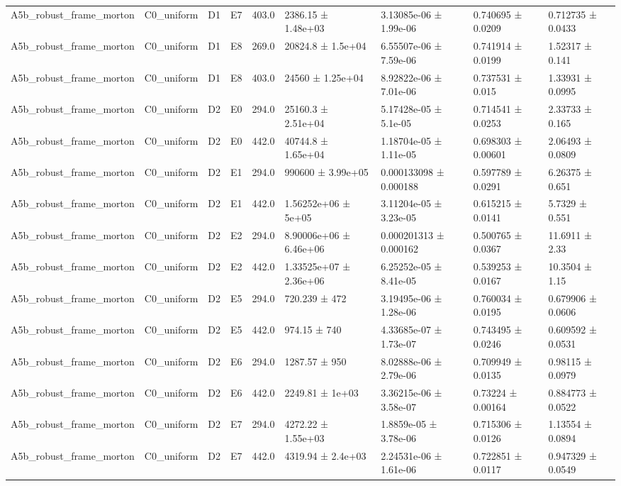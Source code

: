 \begin{table}
\begin{tabular}{lllllllll}
A5b\_robust\_frame\_morton & C0\_uniform & D1 & E7 & 403.0 & 2386.15 ± 1.48e+03 & 3.13085e-06 ± 1.99e-06 & 0.740695 ± 0.0209 & 0.712735 ± 0.0433 \\
A5b\_robust\_frame\_morton & C0\_uniform & D1 & E8 & 269.0 & 20824.8 ± 1.5e+04 & 6.55507e-06 ± 7.59e-06 & 0.741914 ± 0.0199 & 1.52317 ± 0.141 \\
A5b\_robust\_frame\_morton & C0\_uniform & D1 & E8 & 403.0 & 24560 ± 1.25e+04 & 8.92822e-06 ± 7.01e-06 & 0.737531 ± 0.015 & 1.33931 ± 0.0995 \\
A5b\_robust\_frame\_morton & C0\_uniform & D2 & E0 & 294.0 & 25160.3 ± 2.51e+04 & 5.17428e-05 ± 5.1e-05 & 0.714541 ± 0.0253 & 2.33733 ± 0.165 \\
A5b\_robust\_frame\_morton & C0\_uniform & D2 & E0 & 442.0 & 40744.8 ± 1.65e+04 & 1.18704e-05 ± 1.11e-05 & 0.698303 ± 0.00601 & 2.06493 ± 0.0809 \\
A5b\_robust\_frame\_morton & C0\_uniform & D2 & E1 & 294.0 & 990600 ± 3.99e+05 & 0.000133098 ± 0.000188 & 0.597789 ± 0.0291 & 6.26375 ± 0.651 \\
A5b\_robust\_frame\_morton & C0\_uniform & D2 & E1 & 442.0 & 1.56252e+06 ± 5e+05 & 3.11204e-05 ± 3.23e-05 & 0.615215 ± 0.0141 & 5.7329 ± 0.551 \\
A5b\_robust\_frame\_morton & C0\_uniform & D2 & E2 & 294.0 & 8.90006e+06 ± 6.46e+06 & 0.000201313 ± 0.000162 & 0.500765 ± 0.0367 & 11.6911 ± 2.33 \\
A5b\_robust\_frame\_morton & C0\_uniform & D2 & E2 & 442.0 & 1.33525e+07 ± 2.36e+06 & 6.25252e-05 ± 8.41e-05 & 0.539253 ± 0.0167 & 10.3504 ± 1.15 \\
A5b\_robust\_frame\_morton & C0\_uniform & D2 & E5 & 294.0 & 720.239 ± 472 & 3.19495e-06 ± 1.28e-06 & 0.760034 ± 0.0195 & 0.679906 ± 0.0606 \\
A5b\_robust\_frame\_morton & C0\_uniform & D2 & E5 & 442.0 & 974.15 ± 740 & 4.33685e-07 ± 1.73e-07 & 0.743495 ± 0.0246 & 0.609592 ± 0.0531 \\
A5b\_robust\_frame\_morton & C0\_uniform & D2 & E6 & 294.0 & 1287.57 ± 950 & 8.02888e-06 ± 2.79e-06 & 0.709949 ± 0.0135 & 0.98115 ± 0.0979 \\
A5b\_robust\_frame\_morton & C0\_uniform & D2 & E6 & 442.0 & 2249.81 ± 1e+03 & 3.36215e-06 ± 3.58e-07 & 0.73224 ± 0.00164 & 0.884773 ± 0.0522 \\
A5b\_robust\_frame\_morton & C0\_uniform & D2 & E7 & 294.0 & 4272.22 ± 1.55e+03 & 1.8859e-05 ± 3.78e-06 & 0.715306 ± 0.0126 & 1.13554 ± 0.0894 \\
A5b\_robust\_frame\_morton & C0\_uniform & D2 & E7 & 442.0 & 4319.94 ± 2.4e+03 & 2.24531e-06 ± 1.61e-06 & 0.722851 ± 0.0117 & 0.947329 ± 0.0549 \\

\end{tabular}
\end{table}
